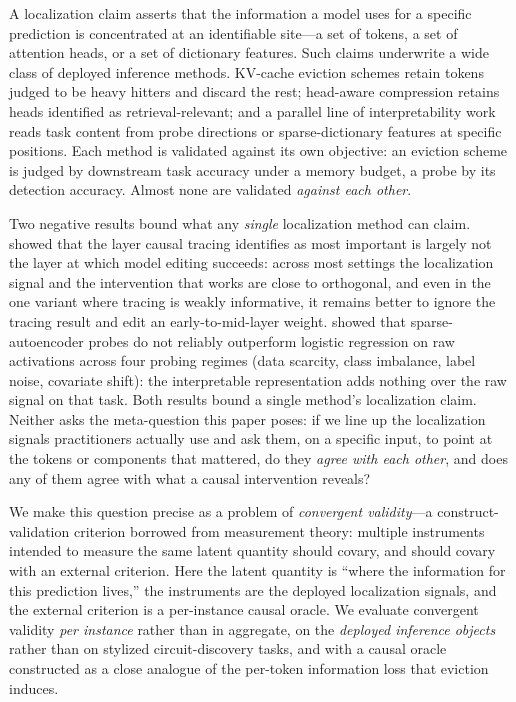 \documentclass[11pt]{article}
\begin{document}
A localization claim asserts that the information a model uses for a specific
prediction is concentrated at an identifiable site---a set of tokens, a set
of attention heads, or a set of dictionary features. Such claims underwrite
a wide class of deployed inference methods. KV-cache eviction schemes retain
tokens judged to be heavy hitters and discard the rest; head-aware
compression retains heads identified as retrieval-relevant; and a parallel
line of interpretability work reads task content from probe directions or
sparse-dictionary features at specific positions. Each method is validated
against its own objective: an eviction scheme is judged by downstream task
accuracy under a memory budget, a probe by its detection accuracy. Almost
none are validated \emph{against each other}.

Two negative results bound what any \emph{single} localization method can
claim. \citet{hase2023} showed that the layer causal tracing identifies as
most important is largely not the layer at which model editing succeeds:
across most settings the localization signal and the intervention that works
are close to orthogonal, and even in the one variant where tracing is weakly
informative, it remains better to ignore the tracing result and edit an
early-to-mid-layer weight.
\citet{kantamneni2025} showed that sparse-autoencoder probes do not
reliably outperform logistic regression on raw activations across four
probing regimes (data scarcity, class imbalance, label noise, covariate
shift): the interpretable representation adds nothing over the raw signal
on that task. Both results bound a single method's localization claim.
Neither asks the meta-question this paper poses: if we line up the
localization signals practitioners actually use and ask them, on a specific
input, to point at the tokens or components that mattered, do they
\emph{agree with each other}, and does any of them agree with what a causal
intervention reveals?

We make this question precise as a problem of \emph{convergent validity}---a
construct-validation criterion borrowed from measurement theory: multiple
instruments intended to measure the same latent quantity should covary, and
should covary with an external criterion. Here the latent quantity is
``where the information for this prediction lives,'' the instruments are the
deployed localization signals, and the external criterion is a per-instance
causal oracle. We evaluate convergent validity \emph{per instance} rather
than in aggregate, on the \emph{deployed inference objects} rather than on
stylized circuit-discovery tasks, and with a causal oracle constructed as a
close analogue of the per-token information loss that eviction induces.
\end{document}
